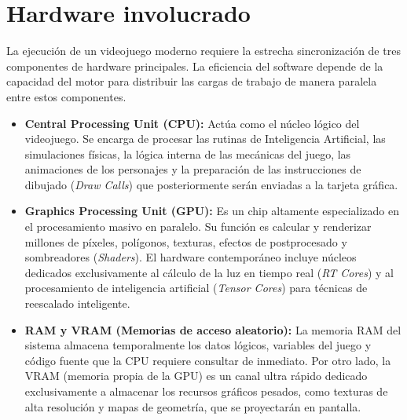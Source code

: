 \documentclass[12pt]{report}
\begin{document}
\section{Hardware involucrado}

La ejecución de un videojuego moderno requiere la estrecha sincronización de tres componentes de hardware principales. La eficiencia del software depende de la capacidad del motor para distribuir las cargas de trabajo de manera paralela entre estos componentes.

\begin{itemize}
    \item \textbf{Central Processing Unit (CPU):} Actúa como el núcleo lógico del videojuego. Se encarga de procesar las rutinas de Inteligencia Artificial, las simulaciones físicas, la lógica interna de las mecánicas del juego, las animaciones de los personajes y la preparación de las instrucciones de dibujado (\textit{Draw Calls}) que posteriormente serán enviadas a la tarjeta gráfica.
    \item \textbf{Graphics Processing Unit (GPU):} Es un chip altamente especializado en el procesamiento masivo en paralelo. Su función es calcular y renderizar millones de píxeles, polígonos, texturas, efectos de postprocesado y sombreadores (\textit{Shaders}). El hardware contemporáneo incluye núcleos dedicados exclusivamente al cálculo de la luz en tiempo real (\textit{RT Cores}) y al procesamiento de inteligencia artificial (\textit{Tensor Cores}) para técnicas de reescalado inteligente.
    \item \textbf{RAM y VRAM (Memorias de acceso aleatorio):} La memoria RAM del sistema almacena temporalmente los datos lógicos, variables del juego y código fuente que la CPU requiere consultar de inmediato. Por otro lado, la VRAM (memoria propia de la GPU) es un canal ultra rápido dedicado exclusivamente a almacenar los recursos gráficos pesados, como texturas de alta resolución y mapas de geometría, que se proyectarán en pantalla.
\end{itemize}
\end{document}
